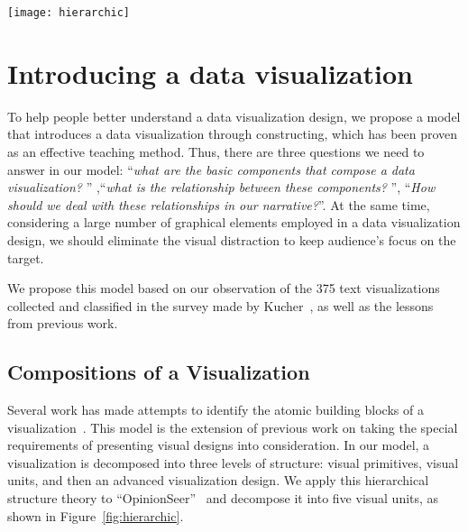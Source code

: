 
\begin{figure*}
 \centering %
 \texttt{[image: hierarchic]}
 \caption{An example of the hierarchical structure of a visualization, Opinion Seer\cite{wu_opinionseer:_2010}}
 \label{fig:hierarchic}
\end{figure*} 

\section{Introducing a data visualization} \label{analysis}
To help people better understand a data visualization design, we propose a model that introduces a data visualization through constructing, which has been proven as an effective teaching method\cite{huron_constructive_2014, chapman_constructive_1988}. Thus, there are three questions we need to answer in our model: ``\textit{what are the basic components that compose a data visualization? }'' ,``\textit{what is the relationship between these components? }'', ``\textit{How should we deal with these relationships in our narrative?}''. At the same time, considering a large number of graphical elements employed in a data visualization design, we should eliminate the visual distraction to keep audience's focus on the target.

We propose this model based on our observation of the 375 text visualizations collected and classified in the survey made by Kucher~\cite{kucher2015text}, as well as the lessons from previous work. 

\subsection{Compositions of a Visualization}\label{compositions}
Several work has made attempts to identify the atomic building blocks of a visualization~\cite{mendez_ivolver:_2016, bertin1983semiology}. This model is the extension of previous work on taking the special requirements of presenting visual designs into consideration. In our model, a visualization is decomposed into three levels of structure: visual primitives, visual units, and then an advanced visualization design. 
We apply this hierarchical structure theory to ``OpinionSeer''~\cite{wu_opinionseer:_2010} and decompose it into five visual units, as shown in Figure~\ref{fig:hierarchic}. 

